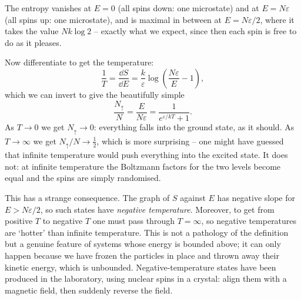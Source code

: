 \documentclass[a4paper]{scrartcl}
\begin{document}
\begin{example}
\begin{center}
	\end{center}
	The entropy vanishes at $E = 0$ (all spins down: one microstate) and at $E = N\varepsilon$ (all spins up: one microstate), and is maximal in between at $E = N\varepsilon/2$, where it takes the value $Nk\log 2$ -- exactly what we expect, since then each spin is free to do as it pleases.

	Now differentiate to get the temperature:
	$$
	\frac 1T = \frac{\dd S}{\dd E} = \frac k\varepsilon \log\left(\frac{N\varepsilon}{E} - 1\right),
	$$
	which we can invert to give the beautifully simple
	$$
	\frac{N_\uparrow}{N} = \frac{E}{N\varepsilon} = \frac{1}{e^{\varepsilon/kT} + 1}.
	$$
	As $T \to 0$ we get $N_\uparrow \to 0$: everything falls into the ground state, as it should. As $T \to \infty$ we get $N_\uparrow/N \to \tfrac 12$, which is more surprising -- one might have guessed that infinite temperature would push everything into the excited state. It does not: at infinite temperature the Boltzmann factors for the two levels become equal and the spins are simply randomised.

	This has a strange consequence. The graph of $S$ against $E$ has negative slope for $E > N\varepsilon/2$, so such states have \emph{negative temperature}. Moreover, to get from positive $T$ to negative $T$ one must pass through $T = \infty$, so negative temperatures are `hotter' than infinite temperature. This is not a pathology of the definition but a genuine feature of systems whose energy is bounded above; it can only happen because we have frozen the particles in place and thrown away their kinetic energy, which is unbounded. Negative-temperature states have been produced in the laboratory, using nuclear spins in a crystal: align them with a magnetic field, then suddenly reverse the field.


\end{example}
\end{document}
